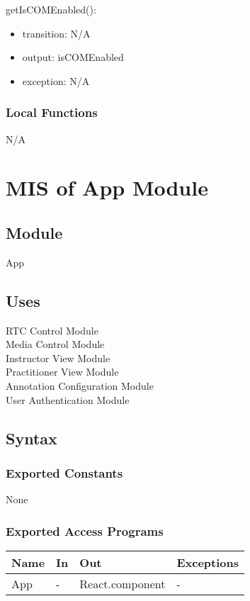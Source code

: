 \documentclass[12pt, titlepage]{article}
\begin{document}
\noindent getIsCOMEnabled():
\begin{itemize}
\item transition: N/A
\item output: isCOMEnabled
\item exception: N/A
\end{itemize}


\subsubsection{Local Functions}

N/A

\section{MIS of App Module}
\label{sec:appmodule}

\subsection{Module}
App

\subsection{Uses}
RTC Control Module\\
Media Control Module\\
Instructor View Module\\
Practitioner View Module\\
Annotation Configuration Module\\
User Authentication Module

\subsection{Syntax}

\subsubsection{Exported Constants}
None

\subsubsection{Exported Access Programs}
\begin{table}[h!]
  \centering
  \begin{tabular}{llll}
    \toprule
    \textbf{Name} & \textbf{In} & \textbf{Out}            & \textbf{Exceptions} \\
    \midrule
    App           & -           & React.component         & -                   \\
    \bottomrule
  \end{tabular}
\end{table}
\end{document}
